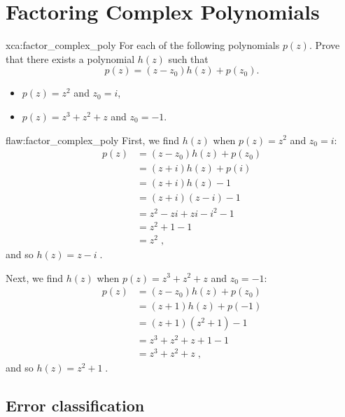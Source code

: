 
\section{Factoring Complex Polynomials}

\begin{xca}{xca:factor_complex_poly}
For each of the following polynomials $p(z)$.  Prove that there exists a polynomial $h(z)$ such that \[p(z) = (z-z_0)h(z) + p(z_0).\]
\begin{itemize}
    \item $p(z) = z^2$  and $z_0 = i$\;,
    \item $p(z) = z^3 + z^2 + z$ and $z_0=-1$\;.
\end{itemize}
\end{xca}

\begin{flaw}{flaw:factor_complex_poly} %
First, we find $h(z)$ when $p(z) = z^2$  and $z_0 = i$\;:
\begin{align*}
    p(z) &= (z - z_0)h(z) + p(z_0) \\
    &= (z + i)h(z) + p(i) \\
    &= (z + i)h(z) - 1 \\
    &= (z + i)(z - i) - 1 \\
    &= z^2 - zi + zi - i^2 - 1 \\
    &= z^2 + 1 -1 \\
    &= z^2\;,
\end{align*}
and so $h(z) = z-i\;.$

\noindent Next, we find $h(z)$ when $p(z) = z^3 + z^2 + z$  and $z_0 = -1$\;:
\begin{align*}
    p(z) &= (z - z_0)h(z) + p(z_0) \\
    &= (z + 1)h(z) + p(-1) \\
    &= (z + 1)(z^2 +1) - 1 \\
    &= z^3 + z^2 +z +1 -1\\
    &= z^3 + z^2 +z\;,
\end{align*}
and so $h(z) = z^2+1\;.$
\end{flaw}

\clearpage
\subsection{Error classification}

